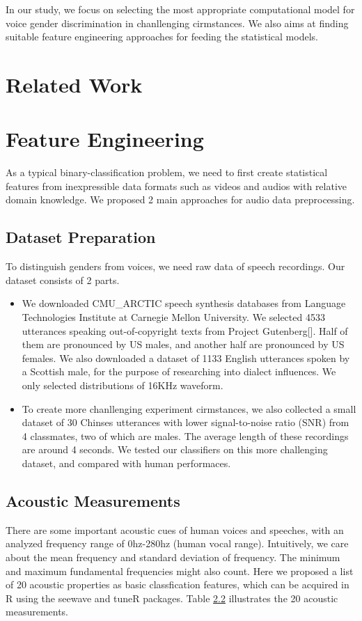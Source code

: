 \documentclass[10pt,letterpaper]{article}
\begin{document}
In our study, we focus on selecting the most appropriate computational model for voice gender discrimination in chanllenging cirmstances. We also aims at finding suitable feature engineering approaches for feeding the statistical models.

\section{Related Work}

\section{Feature Engineering}
As a typical binary-classification problem, we need to first create statistical features from inexpressible data formats such as videos and audios with relative domain knowledge. We proposed 2 main approaches for audio data preprocessing.
\subsection{Dataset Preparation}
To distinguish genders from voices, we need raw data of speech recordings. Our dataset consists of 2 parts.
\begin{itemize}
\item We downloaded CMU\_ARCTIC speech synthesis databases from Language Technologies Institute at Carnegie Mellon University. We selected 4533 utterances speaking out-of-copyright texts from Project Gutenberg[]. Half of them are pronounced by US males, and another half are pronounced by US females. We also downloaded a dataset of 1133 English utterances spoken by a Scottish male, for the purpose of researching into dialect influences. We only selected distributions of 16KHz waveform.
\item To create more chanllenging experiment cirmstances, we also collected a small dataset of 30 Chinses utterances with lower signal-to-noise ratio (SNR) from 4 classmates, two of which are males. The average length of these recordings are around 4 seconds.  We tested our classifiers on this more challenging dataset, and compared with human performaces.
\end{itemize}

\subsection{Acoustic Measurements}
There are some important acoustic cues of human voices and speeches, with an analyzed frequency range of 0hz-280hz (human vocal range). Intuitively, we care about the mean frequency and standard deviation of frequency. The minimum and maximum fundamental frequencies might also count. Here we proposed a list of 20 acoustic properties as basic classfication features, which can be acquired in R using the seewave and tuneR packages. Table \ref{} illustrates the 20 acoustic measurements.
\end{document}
